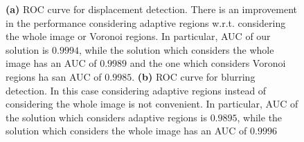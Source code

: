 \documentclass{llncs}
\begin{document}
\begin{figure}[t]
\centering
{}
\caption{\textbf{(a)} ROC curve for displacement detection.
	There is an improvement in the performance considering adaptive regions w.r.t. considering the whole image or Voronoi regions.
	In particular, AUC of our solution is $0.9994$, while the solution which considers the whole image has an AUC of $0.9989$ and the one which considers Voronoi regions ha san AUC of $0.9985$.
	\textbf{(b)} ROC curve for blurring detection.
	In this case considering adaptive regions instead of considering the whole image is not convenient.
	In particular, AUC of the solution which considers adaptive regions is $0.9895$,  while the solution which considers the whole image has an AUC of $0.9996$}
\label{fig:ROC}
\end{figure}
\end{document}
